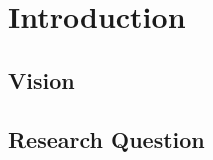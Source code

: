 
\chapter{Introduction}
\label{ch:introduction}

\section{Vision}
\label{sec:vision}

\section{Research Question}
\label{sec:research_question}

